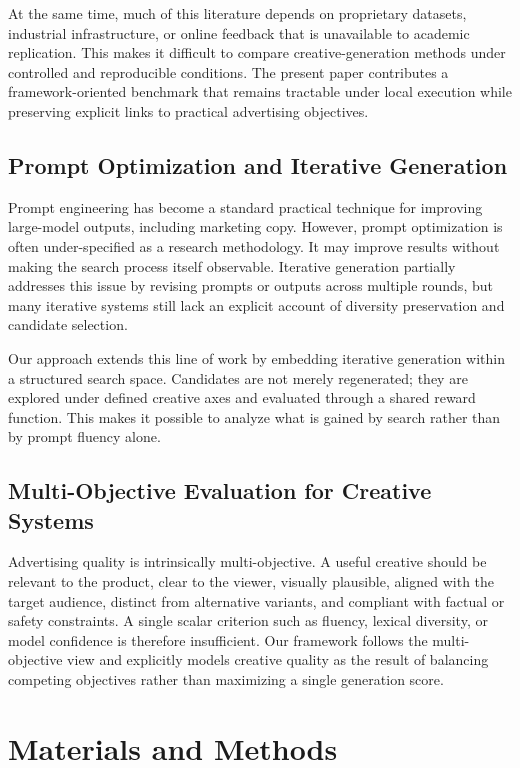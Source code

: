 \documentclass[applsci,article,submit,pdftex,moreauthors]{Definitions/mdpi}
\begin{document}
At the same time, much of this literature depends on proprietary datasets, industrial infrastructure, or online feedback that is unavailable to academic replication. This makes it difficult to compare creative-generation methods under controlled and reproducible conditions. The present paper contributes a framework-oriented benchmark that remains tractable under local execution while preserving explicit links to practical advertising objectives.

\subsection{Prompt Optimization and Iterative Generation}

Prompt engineering has become a standard practical technique for improving large-model outputs, including marketing copy. However, prompt optimization is often under-specified as a research methodology. It may improve results without making the search process itself observable. Iterative generation partially addresses this issue by revising prompts or outputs across multiple rounds, but many iterative systems still lack an explicit account of diversity preservation and candidate selection.

Our approach extends this line of work by embedding iterative generation within a structured search space. Candidates are not merely regenerated; they are explored under defined creative axes and evaluated through a shared reward function. This makes it possible to analyze what is gained by search rather than by prompt fluency alone.

\subsection{Multi-Objective Evaluation for Creative Systems}

Advertising quality is intrinsically multi-objective. A useful creative should be relevant to the product, clear to the viewer, visually plausible, aligned with the target audience, distinct from alternative variants, and compliant with factual or safety constraints. A single scalar criterion such as fluency, lexical diversity, or model confidence is therefore insufficient. Our framework follows the multi-objective view and explicitly models creative quality as the result of balancing competing objectives rather than maximizing a single generation score.

\section{Materials and Methods}
\end{document}
